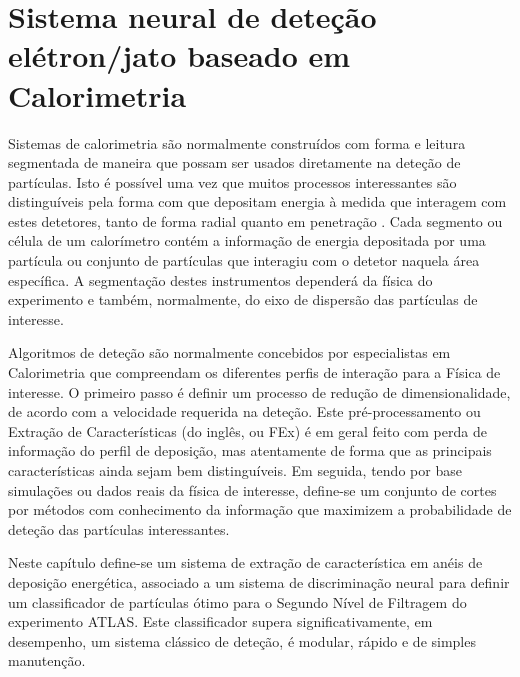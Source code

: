 \typeout{ ====================================================================}
\typeout{ ====================================================================}

\chapter{Sistema neural de deteção elétron/jato baseado em Calorimetria}
\label{chap:neural}

Sistemas de calorimetria são normalmente constru\-í\-dos com forma e leitura
segmentada de maneira que possam ser usados diretamente na dete\-ção de
par\-tí\-culas. Isto é possível uma vez que muitos processos interessantes são
distinguíveis pela forma com que depositam energia à medida que interagem com
estes detetores, tanto de forma radial quanto em penetração
\cite{wigmans-book}. Cada segmento ou célula de um calorímetro contém a
informação de energia depositada por uma par\-tí\-cula ou conjunto de
par\-tí\-culas que interagiu com o detetor naquela área espe\-cí\-fica. A
seg\-men\-ta\-ção destes instrumentos dependerá da física do experimento e
também, normalmente, do eixo de dispersão das partículas de interesse.

Algoritmos de dete\-ção são normalmente concebidos por especialistas em
Calorimetria que compreendam os diferentes perfis de intera\-ção para a Fí\-sica
de interesse. O primeiro passo é definir um processo de redu\-ção de
dimensionalidade, de acordo com a velocidade requerida na deteção. Este
pré-processamento ou Extração de Características (do inglês,  ou FEx) é em geral feito com perda de informação do perfil de
deposição, mas atentamente de forma que as principais características ainda
sejam bem distinguíveis. Em seguida, tendo por base simulações ou dados reais
da física de interesse, define-se um conjunto de cortes por métodos com
conhecimento da informação  que maximizem a probabilidade de
deteção das partículas interessantes.

Neste capítulo define-se um sistema de extração de característica em anéis de
deposição energética, associado a um sistema de discriminação neural para
definir um classificador de partículas ótimo para o Segundo Nível de Filtragem
do experimento ATLAS. Este classificador supera significativamente, em
desempenho, um sistema clássico de deteção, é modular, rápido e de simples
manutenção.

